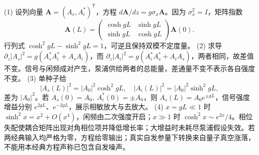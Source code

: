 (1) 设列向量 \(\boldsymbol A=(A_s,A_i^*)^{\mathsf T}\)，方程 \(d\boldsymbol A/dz=g\sigma_x\boldsymbol A\)。因为 \(\sigma_x^2=I\)，矩阵指数
\[
\boldsymbol A(L)=\begin{pmatrix}\cosh gL&\sinh gL\\\sinh gL&\cosh gL\end{pmatrix}\boldsymbol A(0).
\]
行列式 \(\cosh^2gL-\sinh^2gL=1\)，可逆且保持双模不定度量。
(2) 求导 \(\partial_z|A_s|^2=g(A_s^*A_i^*+A_sA_i)\)，而 \(\partial_z|A_i|^2=g(A_i^*A_s^*+A_iA_s)\)，两者相同，故差值不变。信号与闲频成对产生，泵浦供给两者的总能量，差通量不变不表示各自强度不变。
(3) 单种子给
\[
|A_s(L)|^2=|A_0|^2\cosh^2gL,\quad |A_i(L)|^2=|A_0|^2\sinh^2gL,
\]
差为 \(|A_0|^2\)。若 \(A_s(0)=A_0,\ A_i^*(0)=\pm A_0\)，则 \(A_s(L)=A_0e^{\pm gL}\)，信号强度增益分别 \(e^{2gL}\)、\(e^{-2gL}\)，展示相敏放大与去放大。
(4) \(x=gL\ll1\) 时 \(\sinh^2x=x^2+O(x^4)\)，闲频由二次强度开启；\(x\gg1\) 时 \(\cosh^2x\sim e^{2x}/4\)。相位失配使耦合矩阵出现对角相位项并降低增长率；大增益时未耗尽泵浦假设失效。若两经典输入均严格为零，方程给零输出；真实自发参量下转换来自量子真空涨落，不能用本经典方程声称已包含自发噪声。
